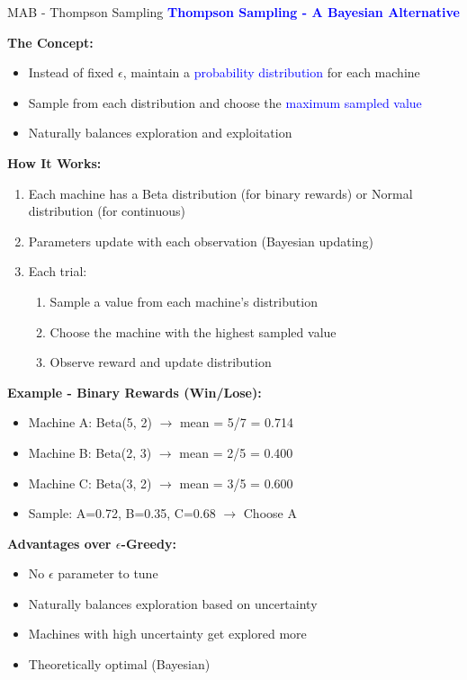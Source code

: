 \documentclass[8pt]{beamer}
\begin{document}
	\begin{frame}{MAB - Thompson Sampling}
		\fontsize{6.5}{7.5}\selectfont
		\textcolor{blue}{\textbf{Thompson Sampling - A Bayesian Alternative}}
		
		\textbf{The Concept:}
		\begin{itemize}
			\item Instead of fixed $\epsilon$, maintain a \textcolor{blue}{probability distribution} for each machine
			\item Sample from each distribution and choose the \textcolor{blue}{maximum sampled value}
			\item Naturally balances exploration and exploitation
		\end{itemize}
		
		\textbf{How It Works:}
		\begin{enumerate}
			\item Each machine has a Beta distribution (for binary rewards) or Normal distribution (for continuous)
			\item Parameters update with each observation (Bayesian updating)
			\item Each trial:
			\begin{enumerate}
				\item Sample a value from each machine's distribution
				\item Choose the machine with the highest sampled value
				\item Observe reward and update distribution
			\end{enumerate}
		\end{enumerate}
		
		\textbf{Example - Binary Rewards (Win/Lose):}
		\begin{itemize}
			\item Machine A: Beta(5, 2) $\rightarrow$ mean = 5/7 = 0.714
			\item Machine B: Beta(2, 3) $\rightarrow$ mean = 2/5 = 0.400
			\item Machine C: Beta(3, 2) $\rightarrow$ mean = 3/5 = 0.600
			\item Sample: A=0.72, B=0.35, C=0.68 $\rightarrow$ Choose A
		\end{itemize}
		
		\textbf{Advantages over $\epsilon$-Greedy:}
		\begin{itemize}
			\item No $\epsilon$ parameter to tune
			\item Naturally balances exploration based on uncertainty
			\item Machines with high uncertainty get explored more
			\item Theoretically optimal (Bayesian)
		\end{itemize}
		

\end{frame}
\end{document}
